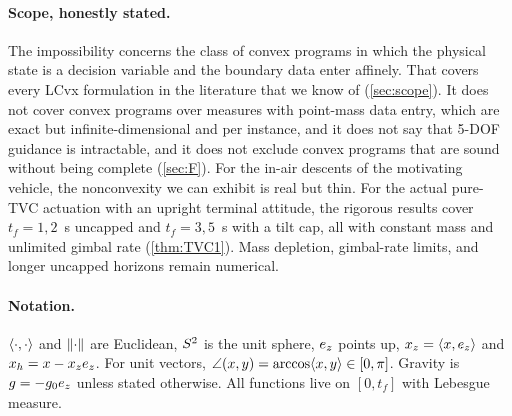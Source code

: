 \paragraph{Scope, honestly stated.}
The impossibility concerns the class of convex programs in which the physical state is a decision variable and the
boundary data enter affinely. That covers every LCvx formulation in the literature that we know of (\cref{sec:scope}). It does not cover convex
programs over measures with point-mass data entry, which are exact but infinite-dimensional and per instance, and it
does not say that 5-DOF guidance is intractable, and it does not exclude convex programs that are sound without being complete
(\cref{sec:F}). For the in-air descents of the motivating vehicle, the nonconvexity we can exhibit is real but thin. For the actual pure-TVC actuation with an upright terminal attitude, the
rigorous results cover $t_f=1,2$~s uncapped and $t_f=3,5$~s with a tilt cap, all with constant mass and unlimited gimbal rate
(\cref{thm:TVC1}). Mass depletion, gimbal-rate limits, and longer uncapped horizons remain numerical.

\paragraph{Notation.}
$\langle \cdot,\cdot\rangle$ and $\lVert \cdot\rVert$ are Euclidean, $S^2$ is the unit sphere, $e_z$ points up, $x_z=\langle x,e_z\rangle$ and
$x_h=x-x_ze_z$. For unit vectors, $\angle(x,y)=\arccos\langle x,y\rangle\in[0,\pi]$. Gravity is $g=-g_0e_z$ unless stated
otherwise. All functions live on $[0,t_f]$ with Lebesgue measure.
